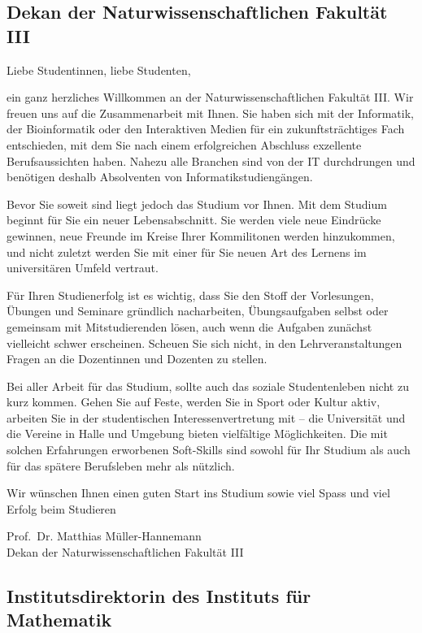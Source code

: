 \subsection*{Dekan der Naturwissenschaftlichen Fakultät III}

Liebe Studentinnen, liebe Studenten,

ein ganz herzliches Willkommen an der Naturwissenschaftlichen Fakultät III.
Wir freuen uns auf die Zusammenarbeit mit Ihnen.
Sie haben sich mit der Informatik, der Bioinformatik oder den Interaktiven Medien für ein
zukunftsträchtiges Fach entschieden, mit dem Sie nach einem
erfolgreichen Abschluss exzellente Berufsaussichten haben.
Nahezu alle Branchen sind von der IT durchdrungen und benötigen deshalb
Absolventen von Informatikstudiengängen.

Bevor Sie soweit sind liegt jedoch das Studium vor Ihnen.
Mit dem Studium beginnt für Sie ein neuer Lebensabschnitt.
Sie werden viele neue Eindrücke gewinnen, neue Freunde im Kreise Ihrer
Kommilitonen werden
hinzukommen, und nicht zuletzt werden Sie mit einer für Sie neuen Art
des Lernens im universitären Umfeld vertraut.

Für Ihren Studienerfolg ist es wichtig, dass Sie den Stoff der Vorlesungen, Übungen und Seminare gründlich nacharbeiten, Übungsaufgaben selbst oder gemeinsam mit Mitstudierenden lösen, auch wenn die Aufgaben zunächst vielleicht schwer erscheinen. Scheuen Sie sich nicht, in den Lehrveranstaltungen Fragen an die
Dozentinnen und Dozenten zu stellen.

Bei aller Arbeit für das Studium, sollte auch das soziale Studentenleben
nicht zu kurz kommen. Gehen Sie auf Feste, werden Sie in Sport oder
Kultur aktiv, arbeiten Sie in der studentischen Interessenvertretung mit
-- die Universität und die Vereine in Halle und Umgebung bieten
vielfältige Möglichkeiten.
Die mit solchen Erfahrungen erworbenen Soft-Skills sind
sowohl für Ihr Studium als auch für das spätere Berufsleben mehr als
nützlich.

Wir wünschen Ihnen einen guten Start ins Studium sowie viel Spass und
viel Erfolg beim Studieren

Prof.~Dr. Matthias Müller-Hannemann \\
Dekan der Naturwissenschaftlichen Fakultät III

\newpage

\subsection*{Institutsdirektorin des Instituts für Mathematik}
 
